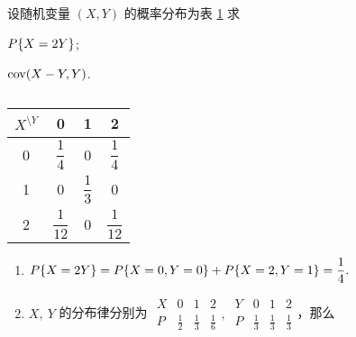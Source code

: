 \begin{example}
    设随机变量 $(X,Y)$ 的概率分布为表 \ref{012140140130} 求\newline
    \begin{enumerate*}[label=(\arabic{*})]
        \item $P\qty{X=2Y}$;
        \item $\mathrm{cov}(X-Y,Y)$.
    \end{enumerate*}
\end{example}
\begin{solution}
    \begin{minipage}{0.3\linewidth}
        \begin{table}[H]
            \centering
            \caption{}
            \label{012140140130}
            \begin{tabular}{c | c c c}
                $X^{\displaystyle\setminus Y}$ & 0               & 1              & 2               \\
                \midrule
                0                              & $\dfrac{1}{4}$  & 0              & $\dfrac{1}{4}$  \\[6pt]
                1                              & 0               & $\dfrac{1}{3}$ & 0               \\[6pt]
                2                              & $\dfrac{1}{12}$ & 0              & $\dfrac{1}{12}$
            \end{tabular}
        \end{table}
    \end{minipage}\hfill
    \begin{minipage}{0.69\linewidth}
        \begin{enumerate}[label=(\arabic{*})]
            \item $P\qty{X=2Y}=P\qty{X=0,Y=0}+P\qty{X=2,Y=1}=\dfrac{1}{4}.$
            \item $X,~Y$ 的分布律分别为 $\begin{array}{c|ccc}
                          X & 0           & 1           & 2           \\\hline
                          P & \frac{1}{2} & \frac{1}{3} & \frac{1}{6}
                      \end{array},~\begin{array}{c|ccc}
                          Y & 0           & 1           & 2           \\\hline
                          P & \frac{1}{3} & \frac{1}{3} & \frac{1}{3}
                      \end{array}$，那么

\end{enumerate}
\end{minipage}
\end{solution}

